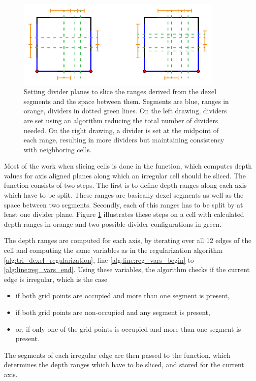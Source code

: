 \begin{figure}
	\centering
	\includegraphics[width=0.9\textwidth]{images/cellslicing_dividers}
	\caption{
		Setting divider planes to slice the ranges derived from the dexel segments and the space between them.
		Segments are blue, ranges in orange, dividers in dotted green lines.
		On the left drawing, dividers are set using an algorithm reducing the total number of dividers needed.
		On the right drawing, a divider is set at the midpoint of each range, resulting in more dividers but maintaining consistency with neighboring cells.
	}
	\label{fig:cellslicing_dividers}
\end{figure}

Most of the work when slicing cells is done in the  function, which computes depth values for axis aligned planes along which an irregular cell should be sliced.
The function consists of two steps.
The first is to define depth ranges along each axis which have to be split.
These ranges are basically dexel segments as well as the space between two segments.
Secondly, each of this ranges has to be split by at least one divider plane.
Figure \ref{fig:cellslicing_dividers} illustrates these steps on a cell with calculated depth ranges in orange and two possible divider configurations in green.

The depth ranges are computed for each axis, by iterating over all 12 edges of the cell and computing the same variables as in the regularization algorithm \ref{alg:tri_dexel_regularization}, line \ref{alg:line:reg_vars_begin} to \ref{alg:line:reg_vars_end}.
Using these variables, the algorithm checks if the current edge is irregular, which is the case
\begin{itemize}
	\item if both grid points are occupied and more than one segment is present,
	\item if both grid points are non-occupied and any segment is present,
	\item or, if only one of the grid points is occupied and more than one segment is present.
\end{itemize}
The segments of each irregular edge are then passed to the  function, which determines the depth ranges which have to be sliced, and stored for the current axis.

